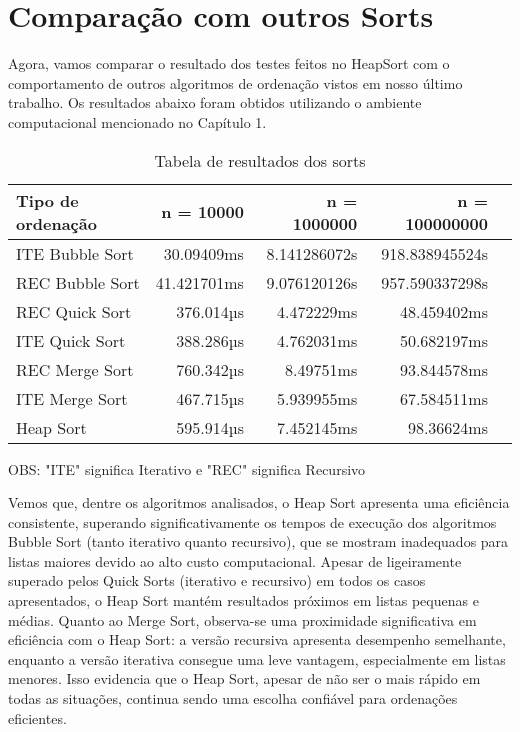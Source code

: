 \section*{Comparação com outros Sorts}

Agora, vamos comparar o resultado dos testes feitos no HeapSort com o comportamento de outros algoritmos de ordenação vistos em nosso último trabalho. Os resultados abaixo foram obtidos utilizando o ambiente computacional mencionado no Capítulo 1.

\begin{table}[h!]
	\centering
	\caption{Tabela de resultados dos sorts}
	\label{tab:sorts_result}
	\begin{tabular}{lrrrr}
		\toprule
		Tipo de ordenação   & n = 10000   & n = 1000000  & n = 100000000 \\
		\midrule
	ITE Bubble Sort & 30.09409ms & 8.141286072s & 918.838945524s \\
    REC Bubble Sort & 41.421701ms & 9.076120126s & 957.590337298s \\
    REC Quick Sort  & 376.014µs & 4.472229ms   & 48.459402ms \\
    ITE Quick Sort  & 388.286µs & 4.762031ms   & 50.682197ms \\
    REC Merge Sort  & 760.342µs & 8.49751ms    & 93.844578ms \\
    ITE Merge Sort  & 467.715µs & 5.939955ms   & 67.584511ms \\
		\midrule
		Heap Sort       & 595.914µs & 7.452145ms   & 98.36624ms \\
		\bottomrule
	\end{tabular}
\end{table}

OBS: "ITE" significa Iterativo e "REC" significa Recursivo  

Vemos que, dentre os algoritmos analisados, o Heap Sort apresenta uma eficiência consistente, superando significativamente os tempos de execução dos algoritmos Bubble Sort (tanto iterativo quanto recursivo), que se mostram inadequados para listas maiores devido ao alto custo computacional. Apesar de ligeiramente superado pelos Quick Sorts (iterativo e recursivo) em todos os casos apresentados, o Heap Sort mantém resultados próximos em listas pequenas e médias. Quanto ao Merge Sort, observa-se uma proximidade significativa em eficiência com o Heap Sort: a versão recursiva apresenta desempenho semelhante, enquanto a versão iterativa consegue uma leve vantagem, especialmente em listas menores. Isso evidencia que o Heap Sort, apesar de não ser o mais rápido em todas as situações, continua sendo uma escolha confiável para ordenações eficientes.


% 
%
% 
